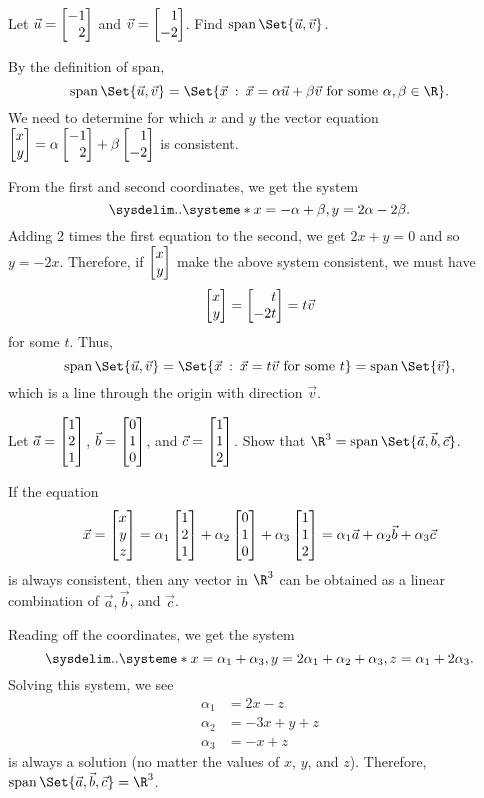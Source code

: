 \begin{example}
	Let $\vec u=\mat{-1\\2}$ and $\vec v=\mat{1\\-2}$. Find $\Span\Set{\vec u,\vec v}$.

	By the definition of span,
	\[
		\Span\Set{\vec u,\vec v}=
		\Set{\vec x\given \vec x=\alpha\vec u+\beta\vec v\text{ for some }\alpha,\beta\in\R}.
	\]
	We need to determine for which $x$ and $y$ the vector equation $\mat{x\\y} = \alpha\mat{-1\\2}+\beta\mat{1\\-2}$ is consistent.
	
	From the first and second coordinates, we get the system
	\[
		\sysdelim..\systeme*{x=-\alpha+\beta, y=2\alpha-2\beta}.
	\]
	Adding 2 times the first equation to the second, we get $2x+y=0$ and so $y=-2x$.
	Therefore, if $\mat{x\\y}$ make the above system consistent, we must have
	\[
		\mat{x\\y}=\mat{t\\-2t}=t\vec v
	\]
	for some $t$.
	Thus,
	\[
		\Span\Set{\vec u,\vec v}=
		\Set{\vec x\given \vec x=t\vec v\text{ for some }t}=\Span\Set{\vec v},
	\]
	which is a line through the origin with direction $\vec v$.
\end{example}

\begin{example}
	Let $\vec a=\mat{1\\2\\1}$, $\vec b=\mat{0\\1\\0}$, and $\vec c=\mat{1\\1\\2}$. Show that
	$\R^3=\Span\Set{\vec a,\vec b,\vec c}$.

	If the equation 
	\[
		\vec x=\mat{x\\y\\z} = \alpha_1\mat{1\\2\\1}+\alpha_2\mat{0\\1\\0}+\alpha_3\mat{1\\1\\2}
		 = \alpha_1\vec a+\alpha_2\vec b+\alpha_3\vec c
	\]
	is always consistent, then any vector in $\R^3$ can be obtained as a linear combination of
	$\vec a, \vec b$, and $\vec c$.
	
	Reading off the coordinates, we get the system
	\[
		\sysdelim..\systeme*{x=\alpha_1+\alpha_3, y=2\alpha_1+\alpha_2+\alpha_3, z=\alpha_1+2\alpha_3}.
	\]
	Solving this system, we see
	\[
		\begin{aligned}
			\alpha_1&=2x-z\\
			\alpha_2&=-3x+y+z\\
			\alpha_3&=-x+z
		\end{aligned}
	\]
	is always a solution (no matter the values of $x$, $y$, and $z$). Therefore,
	$\Span\Set{\vec a,\vec b,\vec c}=\R^3$.
\end{example}

